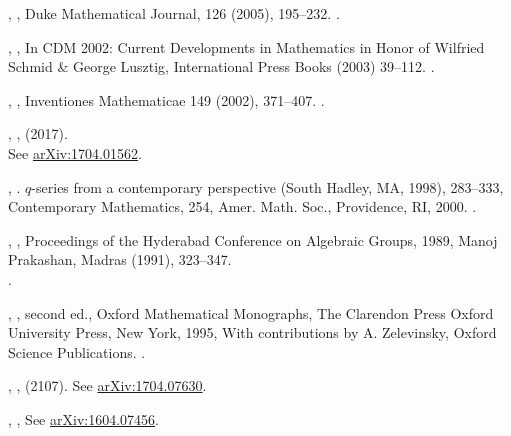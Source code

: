 \documentclass[12pt]{amsart}
\theoremstyle{plain}
\theoremstyle{definition}
\theoremstyle{remark}
\begin{document}
\begin{thebibliography}{10}
,
,
Duke Mathematical Journal,  126 (2005), 195--232. .


,
,  
In CDM 2002: Current Developments in Mathematics in Honor of  Wilfried Schmid \& George Lusztig, 
International Press Books  (2003) 39--112. . 

, 
, 
Inventiones Mathematicae 149 (2002), 371--407. .


,
, (2017).\\
See \href{http://arxiv.org/abs/arXiv:1704.01562}{arXiv:1704.01562}.

,
.
$q$-series from a contemporary perspective (South Hadley, MA, 1998), 283--333, 
Contemporary Mathematics, 254, Amer. Math. Soc., Providence, RI, 2000. .


,
, 
Proceedings of the Hyderabad Conference on Algebraic Groups, 1989, Manoj Prakashan, Madras (1991), 323--347. \\
.


,
, second ed., Oxford
Mathematical Monographs, The Clarendon Press Oxford University Press, New York, 1995, 
With contributions by A. Zelevinsky, Oxford Science Publications. .
  
 ,
 , (2107).
 See \href{http://arxiv.org/abs/arXiv:1704.07630}{arXiv:1704.07630}.
 
 
  ,
  ,
See \href{http://arxiv.org/abs/arXiv:1604.07456}{arXiv:1604.07456}.


\end{thebibliography}
\end{document}
